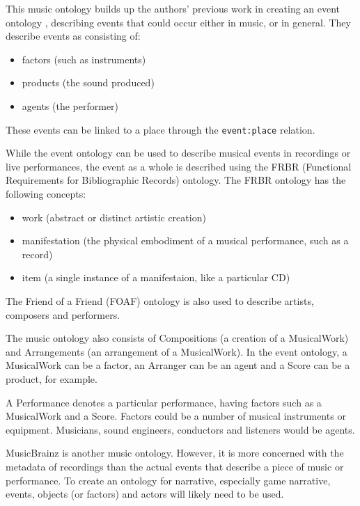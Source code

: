 \documentclass{llncs}
\begin{document}
This music ontology builds up the authors' previous work in creating an event ontology \cite{Raimond2012}, describing events that could occur either in music, or in general. They describe events as consisting of:

\begin{itemize}
\item factors (such as instruments)
\item products (the sound produced)
\item agents (the performer)
\end{itemize}

These events can be linked to a place through the \texttt{event:place} relation.

While the event ontology can be used to describe musical events in recordings or live performances, the event as a whole is described using the FRBR (Functional Requirements for Bibliographic Records) ontology. The FRBR ontology has the following concepts:

\begin{itemize}
\item work (abstract or distinct artistic creation)
\item manifestation (the physical embodiment of a musical performance, such as a record)
\item item (a single instance of a manifestaion, like a particular CD)
\end{itemize}

The Friend of a Friend (FOAF) ontology is also used to describe artists, composers and performers.

The music ontology also consists of Compositions (a creation of a MusicalWork) and Arrangements (an arrangement of a MusicalWork). In the event ontology, a MusicalWork can be a factor, an Arranger can be an agent and a Score can be a product, for example.

A Performance denotes a particular performance, having factors such as a MusicalWork and a Score. Factors could be a number of musical instruments or equipment. Musicians, sound engineers, conductors and listeners would be agents. 

MusicBrainz \cite{swartz2002musicbrainz} is another music ontology. However, it is more concerned with the metadata of recordings than the actual events that describe a piece of music or performance. To create an ontology for narrative, especially game narrative, events, objects (or factors) and actors will likely need to be used.
\end{document}
